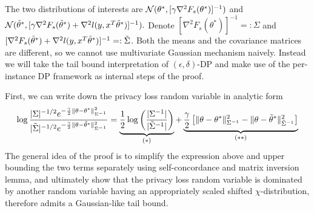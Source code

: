 	The two distributions of interests are $\mathcal{N}(\theta^*,  [\gamma \nabla^2 F_s(\theta^*)]^{-1})$ and $\mathcal{N}(\tilde{\theta}^*, [\gamma \nabla^2 F_s(\tilde{\theta}^*) + \nabla^2l(y,x^T\tilde{\theta}^*)]^{-1}).$
	Denote $[\nabla^2 F_s(\theta^*)]^{-1} =: \Sigma$ and $[\nabla^2 F_s(\tilde{\theta}^*) + \nabla^2l(y,x^T\tilde{\theta}^*)]^{-1} =: \tilde{\Sigma}$.
	Both the means and the covariance matrices are different, so we cannot use multivariate Gaussian mechanism naively. Instead we will take the tail bound interpretation of $(\epsilon,\delta)$-DP and make use of the per-instance DP framework as internal steps of the proof. 
	
	First, we can write down the privacy loss random variable in analytic form
	\begin{align*}
	\log\frac{|\Sigma|^{-1/2}e^{- \frac{\gamma}{2}\|\theta -\theta^*\|_{\Sigma^{-1}}^2}}{|\tilde{\Sigma}|^{-1/2}e^{- \frac{\gamma}{2}\|\theta -\tilde{\theta}^*\|_{\tilde{\Sigma}^{-1}}^2}}
	=\underbrace{\frac{1}{2}\log \left(\frac{|\Sigma^{-1}|}{|\tilde{\Sigma}^{-1}|}\right)}_{(*)} +  \underbrace{\frac{\gamma}{2}\left[\|\theta -\theta^*\|_{\Sigma^{-1}}^2 - \|\theta -\tilde{\theta}^*\|_{\tilde{\Sigma}^{-1}}^2\right]}_{(**)}
	\end{align*}
	The general idea of the proof is to simplify the expression above and  upper bounding the two terms separately using self-concordance and matrix inversion lemma, and ultimately show that the privacy loss random variable is dominated by another random variable having an appropriately scaled shifted $\chi$-distribution, therefore admits a Gaussian-like tail bound.
	

